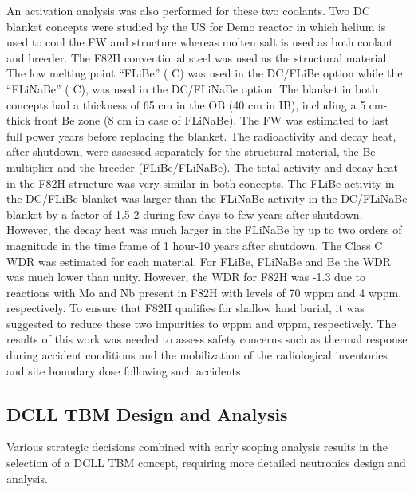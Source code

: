 An activation analysis was also performed for these two coolants.  Two
\gls{DC} blanket concepts were studied by the US for Demo reactor in which
helium is used to cool the \gls{FW} and structure whereas molten salt is used
as both coolant and breeder. The F82H conventional steel was used as the
structural material. The low melting point “FLiBe” ( \textdegree C) was
used in the DC/FLiBe option while the “FLiNaBe” ( \textdegree C), was
used in the DC/FLiNaBe option. The blanket in both concepts had a thickness of
65 cm in the \gls{OB} (40 cm in \gls{IB}), including a 5 cm-thick front Be
zone (8 cm in case of FLiNaBe). The \gls{FW} was estimated to last  full power years before replacing the blanket. The radioactivity and decay
heat, after shutdown, were assessed separately for the structural material,
the Be multiplier and the breeder (FLiBe/FLiNaBe). The total activity and
decay heat in the F82H structure was very similar in both concepts. The FLiBe
activity in the DC/FLiBe blanket was larger than the FLiNaBe activity in the
DC/FLiNaBe blanket by a factor of 1.5-2 during few days to few years after
shutdown.  However, the decay heat was much larger in the FLiNaBe by up to two
orders of magnitude in the time frame of 1 hour-10 years after shutdown. The
Class C \gls{WDR} was estimated for each material. For FLiBe, FLiNaBe and Be
the \gls{WDR} was much lower than unity.  However, the \gls{WDR} for F82H was
-1.3 due to reactions with Mo and Nb present in F82H with
levels of 70 wppm and 4 wppm, respectively. To ensure that F82H qualifies for
shallow land burial, it was suggested to reduce these two impurities to
 wppm and  wppm, respectively. The results of this
work was needed to assess safety concerns such as thermal response during
accident conditions and the mobilization of the radiological inventories and
site boundary dose following such
accidents.

\subsection{\acrfull{DCLL} \acrfull{TBM} Design and Analysis}

Various strategic decisions combined with early scoping analysis results in
the selection of a \gls{DCLL} \gls{TBM} concept, requiring more detailed
neutronics design and analysis.


